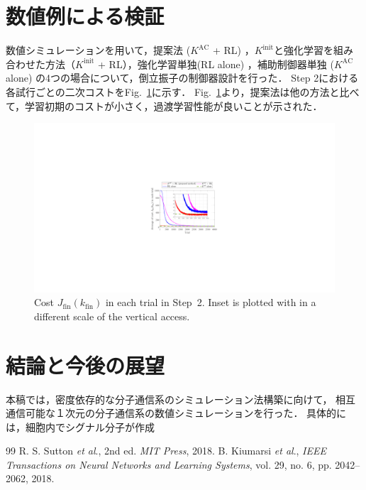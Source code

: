 \documentclass[twocolumn]{jarticle}
\newcommand{\rfig}[1]{Fig.~\ref{#1}}
\begin{document}
\section{数値例による検証}
数値シミュレーションを用いて，提案法 ($K^{\mathrm{AC}}$ + RL) ，$K^{\mathrm{init}}$と強化学習を組み合わせた方法（$K^{\mathrm{init}}$ + RL），強化学習単独(RL alone) ，補助制御器単独 ($K^{\mathrm{AC}}$ alone) の4つの場合について，倒立振子の制御器設計を行った．
Step 2における各試行ごとの二次コストを\rfig{fig:simulation}に示す．
\rfig{fig:simulation}より，提案法は他の方法と比べて，学習初期のコストが小さく，過渡学習性能が良いことが示された．
\begin{figure}[tb]
    \centering
    \includegraphics[width=\columnwidth]{figures/step2_cost_fig.pdf}
    \caption{Cost $J_\mathrm{fin}(k_{\mathrm{fin}})$ in each trial in Step~2. Inset is plotted with in a different scale of the vertical access. %
    }
    \label{fig:simulation}
\end{figure}


\section{結論と今後の展望}
本稿では，密度依存的な分子通信系のシミュレーション法構築に向けて，
相互通信可能な１次元の分子通信系の数値シミュレーションを行った．
具体的には，細胞内でシグナル分子が作成



\begin{thebibliography} {99}
     R. S. Sutton {\it et al}., %
    2nd ed. { \it MIT Press}, 2018.
     B. Kiumarsi {\it et al}., 
    {\it IEEE Transactions on Neural Networks and Learning Systems}, vol. 29, no. 6, pp. 2042–2062, 2018.
\end{thebibliography}
\end{document}
